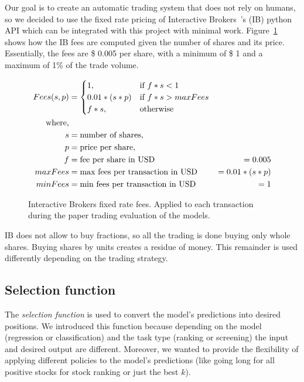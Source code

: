  
Our goal is to create an automatic trading system that does not rely on humans, so we decided to use the fixed rate pricing of Interactive Brokers~\cite{ibrokers}'s (IB) python API which can be integrated with this project with minimal work. 
Figure~\ref{eq:ibfees} shows how the IB fees are computed given the number of shares and its price. Essentially, the fees are \$ 0.005 per share, with a minimum of \$ 1 and a maximum of 1\% of the trade volume.
\begin{figure}
 \begin{align*}
    Fees(s, p) &= 
    \begin{cases}
      1, & \text{if}\ f * s < 1 \\
      0.01 * (s * p) & \text{if}\ f * s > maxFees \\
      f * s, & \text{otherwise} \\
    \end{cases} 
    \notag\\
    \text{where,} & \\
    s &= \text{number of shares}, \\
    p &= \text{price per share}, \\
    f &= \text{fee per share in USD} &= 0.005  \\
    maxFees &= \text{max fees per transaction in USD} &= 0.01 * (s * p) \\
    minFees &= \text{min fees per transaction in USD} &= 1 \\
\end{align*}
\caption{Interactive Brokers fixed rate fees. Applied to each transaction during the paper trading evaluation of the models.}
\label{eq:ibfees}
\end{figure}
IB does not allow to buy fractions, so all the trading is done buying only whole shares. Buying shares by units creates a residue of money. This remainder is used differently depending on the trading strategy.


\subsection{Selection function}
\label{subsec:selection_function}

The \textit{selection function} is used to convert the model's predictions into desired positions. We introduced this function because depending on the model (regression or classification) and the task type (ranking or screening) the input and desired output are different. Moreover, we wanted to provide the flexibility of applying different policies to the model's predictions (like going long for all positive stocks for stock ranking or just the best $k$).

